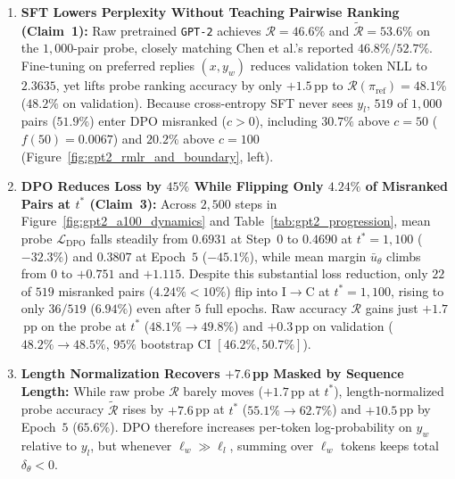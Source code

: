 \documentclass[11pt]{article}
\theoremstyle{plain}
\theoremstyle{definition}
\newcommand{\piref}{\pi_{\mathrm{ref}}}
\newcommand{\LDPO}{\mathcal{L}_{\mathrm{DPO}}}
\newcommand{\Racc}{\mathcal{R}}
\newcommand{\Racctilde}{\widetilde{\mathcal{R}}}
\newcommand{\ItoC}{\mathrm{I{\to}C}}
\begin{document}
\begin{enumerate}[leftmargin=1.8em,itemsep=2.5pt,topsep=2pt]
  \item \textbf{SFT Lowers Perplexity Without Teaching Pairwise Ranking (Claim~1):} Raw pretrained \texttt{GPT-2} achieves $\Racc = 46.6\%$ and $\Racctilde = 53.6\%$ on the $1{,}000$-pair probe, closely matching Chen et al.'s reported $46.8\% / 52.7\%$. Fine-tuning on preferred replies $(x, y_w)$ reduces validation token NLL to $2.3635$, yet lifts probe ranking accuracy by only $+1.5$\,pp to $\Racc(\piref) = 48.1\%$ ($48.2\%$ on validation). Because cross-entropy SFT never sees $y_l$, $519$ of $1{,}000$ pairs ($51.9\%$) enter DPO misranked ($c > 0$), including $30.7\%$ above $c = 50$ ($f(50) = 0.0067$) and $20.2\%$ above $c = 100$ (Figure~\ref{fig:gpt2_rmlr_and_boundary}, left).

  \item \textbf{DPO Reduces Loss by $45\%$ While Flipping Only $4.24\%$ of Misranked Pairs at $t^*$ (Claim~3):} Across $2{,}500$ steps in Figure~\ref{fig:gpt2_a100_dynamics} and Table~\ref{tab:gpt2_progression}, mean probe $\LDPO$ falls steadily from $0.6931$ at Step~$0$ to $0.4690$ at $t^* = 1{,}100$ ($-32.3\%$) and $0.3807$ at Epoch~$5$ ($-45.1\%$), while mean margin $\bar{u}_\theta$ climbs from $0$ to $+0.751$ and $+1.115$. Despite this substantial loss reduction, only $22$ of $519$ misranked pairs ($4.24\% < 10\%$) flip into $\ItoC$ at $t^* = 1{,}100$, rising to only $36 / 519$ ($6.94\%$) even after $5$ full epochs. Raw accuracy $\Racc$ gains just $+1.7$\,pp on the probe at $t^*$ ($48.1\% \to 49.8\%$) and $+0.3$\,pp on validation ($48.2\% \to 48.5\%$, $95\%$ bootstrap CI $[46.2\%, 50.7\%]$).

  \item \textbf{Length Normalization Recovers $+7.6$\,pp Masked by Sequence Length:} While raw probe $\Racc$ barely moves ($+1.7$\,pp at $t^*$), length-normalized probe accuracy $\Racctilde$ rises by $+7.6$\,pp at $t^*$ ($55.1\% \to 62.7\%$) and $+10.5$\,pp by Epoch~$5$ ($65.6\%$). DPO therefore increases per-token log-probability on $y_w$ relative to $y_l$, but whenever $\ell_w \gg \ell_l$, summing over $\ell_w$ tokens keeps total $\delta_\theta < 0$.


\end{enumerate}
\end{document}
